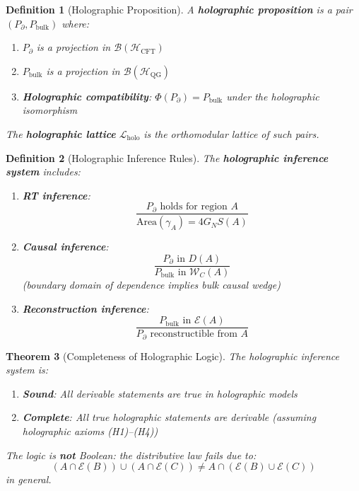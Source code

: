 \documentclass[12pt,a4paper]{article}
\newtheorem{theorem}{Theorem}[section]
\newtheorem{definition}[theorem]{Definition}
\begin{document}
\begin{definition}[Holographic Proposition]\label{def:holo-proposition}
A \textbf{holographic proposition} is a pair $(P_{\partial}, P_{\text{bulk}})$ where:
\begin{enumerate}
    \item $P_{\partial}$ is a projection in $\mathcal{B}(\mathcal{H}_{\text{CFT}})$
    \item $P_{\text{bulk}}$ is a projection in $\mathcal{B}(\mathcal{H}_{\text{QG}})$
    \item \textbf{Holographic compatibility}: $\Phi(P_{\partial}) = P_{\text{bulk}}$ under the holographic isomorphism
\end{enumerate}

The \textbf{holographic lattice} $\mathcal{L}_{\text{holo}}$ is the orthomodular lattice of such pairs.
\end{definition}

\begin{definition}[Holographic Inference Rules]\label{def:holo-inference}
The \textbf{holographic inference system} includes:
\begin{enumerate}
    \item \textbf{RT inference}: 
    \begin{equation}
    \frac{P_\partial \text{ holds for region } A}{\text{Area}(\gamma_A) = 4G_N S(A)}
    \end{equation}
    
    \item \textbf{Causal inference}:
    \begin{equation}
    \frac{P_\partial \text{ in } D(A)}{P_{\text{bulk}} \text{ in } \mathcal{W}_C(A)}
    \end{equation}
    (boundary domain of dependence implies bulk causal wedge)
    
    \item \textbf{Reconstruction inference}:
    \begin{equation}
    \frac{P_{\text{bulk}} \text{ in } \mathcal{E}(A)}{P_\partial \text{ reconstructible from } A}
    \end{equation}
\end{enumerate}
\end{definition}

\begin{theorem}[Completeness of Holographic Logic]\label{thm:holo-logic-complete}
The holographic inference system is:
\begin{enumerate}
    \item \textbf{Sound}: All derivable statements are true in holographic models
    \item \textbf{Complete}: All true holographic statements are derivable (assuming holographic axioms (H1)--(H4))
\end{enumerate}

The logic is \textbf{not} Boolean: the distributive law fails due to:
\begin{equation}
(A \cap \mathcal{E}(B)) \cup (A \cap \mathcal{E}(C)) \neq A \cap (\mathcal{E}(B) \cup \mathcal{E}(C))
\end{equation}
in general.
\end{theorem}
\end{document}
